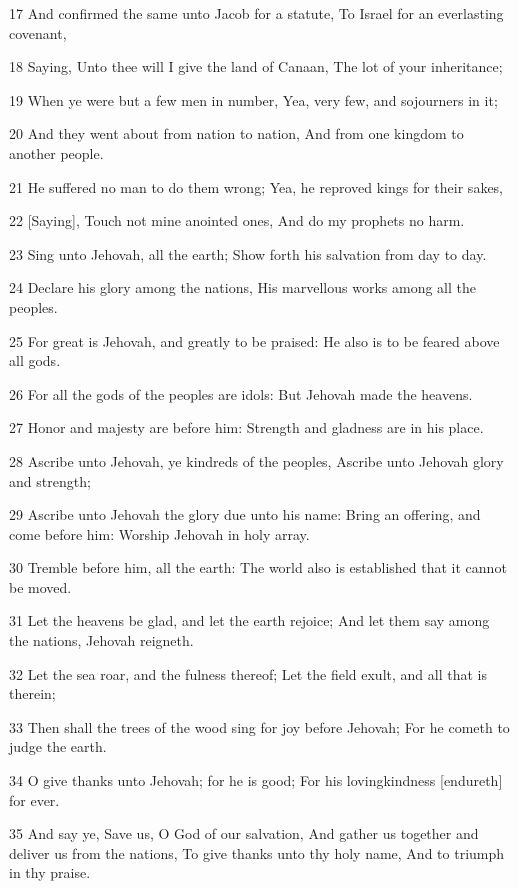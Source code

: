 \par 17 And confirmed the same unto Jacob for a statute, To Israel for an everlasting covenant,
\par 18 Saying, Unto thee will I give the land of Canaan, The lot of your inheritance;
\par 19 When ye were but a few men in number, Yea, very few, and sojourners in it;
\par 20 And they went about from nation to nation, And from one kingdom to another people.
\par 21 He suffered no man to do them wrong; Yea, he reproved kings for their sakes,
\par 22 [Saying], Touch not mine anointed ones, And do my prophets no harm.
\par 23 Sing unto Jehovah, all the earth; Show forth his salvation from day to day.
\par 24 Declare his glory among the nations, His marvellous works among all the peoples.
\par 25 For great is Jehovah, and greatly to be praised: He also is to be feared above all gods.
\par 26 For all the gods of the peoples are idols: But Jehovah made the heavens.
\par 27 Honor and majesty are before him: Strength and gladness are in his place.
\par 28 Ascribe unto Jehovah, ye kindreds of the peoples, Ascribe unto Jehovah glory and strength;
\par 29 Ascribe unto Jehovah the glory due unto his name: Bring an offering, and come before him: Worship Jehovah in holy array.
\par 30 Tremble before him, all the earth: The world also is established that it cannot be moved.
\par 31 Let the heavens be glad, and let the earth rejoice; And let them say among the nations, Jehovah reigneth.
\par 32 Let the sea roar, and the fulness thereof; Let the field exult, and all that is therein;
\par 33 Then shall the trees of the wood sing for joy before Jehovah; For he cometh to judge the earth.
\par 34 O give thanks unto Jehovah; for he is good; For his lovingkindness [endureth] for ever.
\par 35 And say ye, Save us, O God of our salvation, And gather us together and deliver us from the nations, To give thanks unto thy holy name, And to triumph in thy praise.
